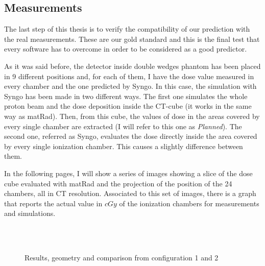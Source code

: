 \documentclass[12pt, a4paper, twoside]{book}
\begin{document}
\subsection{Measurements}
The last step of this thesis is to verify the compatibility of our prediction with the real measurements. These are our gold standard and this is the final test that every software has to overcome in order to be considered as a good predictor.

As it was said before, the detector inside double wedges phantom has been placed in 9 different positions and, for each of them, I have the dose value measured in every chamber and the one predicted by Syngo. In this case, the simulation with Syngo has been made in two different ways. The first one simulates the whole proton beam and the dose deposition inside the CT-cube (it works in the same way as matRad). Then, from this cube, the values of dose in the areas covered by every single chamber are extracted (I will refer to this one as \emph{Planned}). The second one, referred as Syngo, evaluates the dose directly inside the area covered by every single ionization chamber. This causes a slightly difference between them.

In the following pages, I will show a series of images showing a slice of the dose cube evaluated with matRad and the projection of the position of the 24 chambers, all in CT resolution. Associated to this set of images, there is a graph that reports the actual value in $cGy$ of the ionization chambers for measurements and simulations.

\newpage
\begin{figure}[h!]
\centering
{} \quad
{}\\
 \\
 \quad
{} \quad
\caption{Results, geometry and comparison from configuration 1 and 2}
\label{fig:pos12}
\end{figure}
\end{document}
